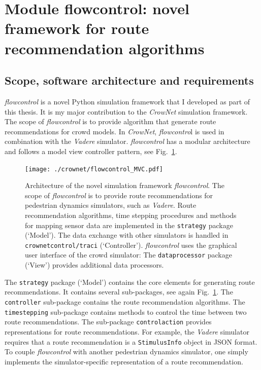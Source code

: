 \section{Module flowcontrol: novel framework for route recommendation algorithms}
\label{sec:flowcontrol}


\subsection{Scope, software architecture and requirements}
\textit{flowcontrol} is a novel Python simulation framework that I developed as part of this thesis. It is my major contribution to the \textit{CrowNet} simulation framework. The scope of \textit{flowcontrol} is to provide algorithm that generate route recommendations for crowd models.
In \textit{CrowNet}, \textit{flowcontro}l is used in combination with the \textit{Vadere} simulator. 
%
\textit{flowcontrol} has a modular architecture and follows a model view controller pattern, see Fig.~\ref{fig:mvcflow}. 


\begin{figure}[hbt!]
\texttt{[image: ./crownet/flowcontrol\_MVC.pdf]} 
\caption[flowcontrol: packages and important classes of the Python  framework ]{Architecture of the novel simulation framework \textit{flowcontrol}. The scope of \textit{flowcontrol} is to provide route recommendations for pedestrian dynamics simulators, such as \textit{Vadere}.  Route recommendation algorithms, time stepping procedures and methods for mapping sensor data are implemented in the \lstinline{strategy} package (`Model'). The data exchange with other simulators is handled in \lstinline{crownetcontrol/traci} (`Controller'). \textit{flowcontrol} uses the graphical user interface of the crowd simulator: The \lstinline{dataprocessor} package (`View') provides additional data processors. }
\label{fig:mvcflow}
\end{figure}


The \lstinline{strategy} package (`Model') contains the core elements for generating route recommendations. It contains several sub-packages, see again Fig.~\ref{fig:mvcflow}. 
The \lstinline{controller} sub-package contains the route recommendation algorithms. The \lstinline{timestepping} sub-package contains methods to control the time between two route recommendations. The sub-package \lstinline{controlaction} provides representations for route recommendations. For example, the \textit{Vadere} simulator requires that a route recommendation is a \lstinline{StimulusInfo} object in JSON format. To couple \textit{flowcontrol} with another pedestrian dynamics simulator, one simply implements the simulator-specific representation of a route recommendation.


